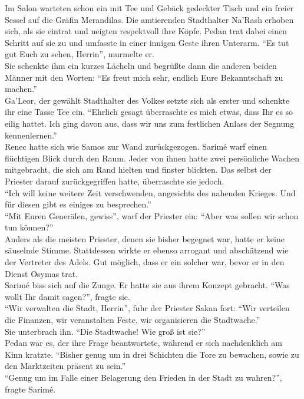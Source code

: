 Im Salon warteten schon ein mit Tee und Gebäck gedeckter Tisch und ein freier Sessel auf die Gräfin 
Merandilas. Die amtierenden Stadthalter Na'Rash erhoben sich, als sie eintrat und neigten 
respektvoll ihre Köpfe. Pedan trat dabei einen Schritt auf sie zu und umfasste in einer innigen 
Geste ihren Unterarm. ``Es tut gut Euch zu sehen, Herrin'', murmelte er.\\
Sie schenkte ihm ein kurzes Lächeln und begrüßte dann die anderen beiden Männer mit den Worten: 
``Es freut mich sehr, endlich Eure Bekanntschaft zu machen.''\\
Ga'Leor, der gewählt Stadthalter des Volkes setzte sich als erster und schenkte ihr eine Tasse Tee 
ein. ``Ehrlich gesagt überraschte es mich etwas, dass Ihr es so eilig hattet. Ich ging davon aus, 
dass wir uns zum festlichen Anlass der Segnung kennenlernen.''\\
Renec hatte sich wie Samos zur Wand zurückgezogen. Sarimé warf einen flüchtigen Blick durch den 
Raum. Jeder von ihnen hatte zwei persönliche Wachen mitgebracht, die sich am Rand hielten und 
finster blickten. Das selbst der Priester darauf zurückgegriffen hatte, überraschte sie jedoch.\\
``Ich will keine weitere Zeit verschwenden, angesichts des nahenden Krieges. Und für diesen gibt 
es einiges zu besprechen.''\\
``Mit Euren Generälen, gewiss'', warf der Priester ein: ``Aber was sollen wir schon tun können?''\\
Anders als die meisten Priester, denen sie bisher begegnet war, hatte er keine säuselnde Stimme. 
Stattdessen wirkte er ebenso arrogant und abschätzend wie der Vertreter des Adels. Gut möglich, 
dass er ein solcher war, bevor er in den Dienst Osymas trat.\\
Sarimé biss sich auf die Zunge. Er hatte sie aus ihrem Konzept gebracht. ``Was wollt Ihr damit 
sagen?'', fragte sie.\\
``Wir verwalten die Stadt, Herrin'', fuhr der Priester Sakan fort: ``Wir verteilen die Finanzen, wir 
veranstalten Feste, wir organisieren die Stadtwache.''\\
Sie unterbrach ihn. ``Die Stadtwache! Wie groß ist sie?''\\
Pedan war es, der ihre Frage beantwortete, während er sich nachdenklich am Kinn kratzte. ``Bisher 
genug um in drei Schichten die Tore zu bewachen, sowie zu den Marktzeiten präsent zu sein.''\\
``Genug um im Falle einer Belagerung den Frieden in der Stadt zu wahren?'', fragte Sarimé.\\
